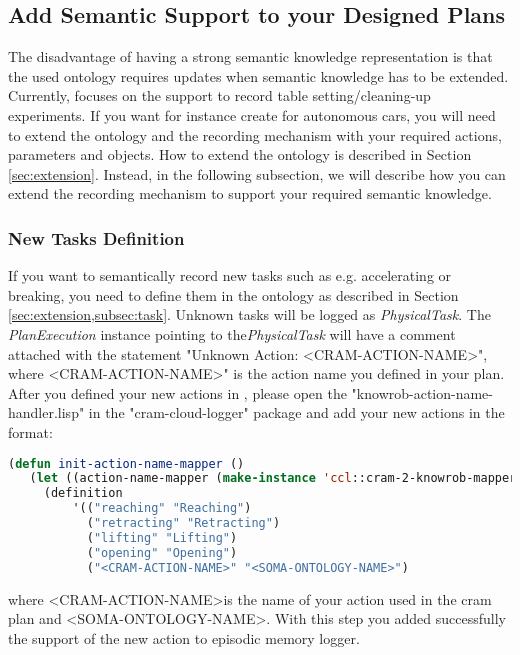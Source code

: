 \subsection{Add Semantic Support to your Designed Plans}
The disadvantage of having a strong semantic knowledge representation is that the used ontology requires updates when semantic knowledge has to be extended. 
Currently, \soma focuses on the support to record table setting/cleaning-up experiments.
If you want for instance create \neems for autonomous cars, you will need to extend the \soma ontology and the recording mechanism with your required actions, parameters and objects.
How to extend the \soma ontology is described in Section \ref{sec:extension}.
Instead, in the following subsection, we will describe how you can extend the \cram recording mechanism to support your required semantic knowledge.

\subsubsection{New Tasks Definition}
If you want to semantically record new tasks such as e.g. accelerating or breaking, you need to define them in the ontology as described in Section \ref{sec:extension,subsec:task}.
Unknown tasks will be logged as \textit{PhysicalTask}.
The \textit{PlanExecution} instance pointing to the\textit{PhysicalTask} will have a comment attached with the statement "Unknown Action: \textless CRAM-ACTION-NAME\textgreater", where \textless CRAM-ACTION-NAME\textgreater" is the action name you defined in your plan.
After you defined your new actions in \soma, please open the "knowrob-action-name-handler.lisp" in the "cram-cloud-logger" package and add your new actions in the format:

\begin{lstlisting}[language=lisp, caption=Steps to Record an Episode for a \cram Plan]
(defun init-action-name-mapper ()
   (let ((action-name-mapper (make-instance 'ccl::cram-2-knowrob-mapper))
     (definition
         '(("reaching" "Reaching")
           ("retracting" "Retracting")
           ("lifting" "Lifting")
           ("opening" "Opening")
           ("<CRAM-ACTION-NAME>" "<SOMA-ONTOLOGY-NAME>")
\end{lstlisting}

where \textless CRAM-ACTION-NAME\textgreater is the name of your action used in the cram plan and \textless SOMA-ONTOLOGY-NAME\textgreater.
With this step you added successfully the support of the new action to \cram \neem episodic memory logger.

